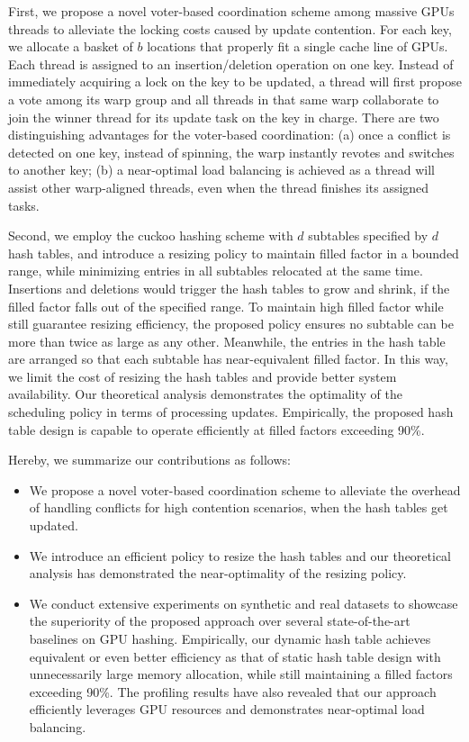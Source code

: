 First, we propose a novel voter-based coordination scheme among massive GPUs threads to alleviate the locking costs caused by update contention. 
For each key, we allocate a basket of $b$ locations that properly fit a single cache line of GPUs. Each thread is assigned to an insertion/deletion operation on one key. Instead of immediately acquiring a lock on the key to be updated, a thread will first propose a vote among its warp group and all threads in that same warp collaborate to join the winner thread for its update task on the key in charge. There are two distinguishing advantages for the voter-based coordination: (a) once a conflict is detected on one key, instead of spinning, the warp instantly revotes and switches to another key; (b) a near-optimal load balancing is achieved as a thread will assist other warp-aligned threads, even when the thread finishes its assigned tasks.

Second, we employ the cuckoo hashing scheme with $d$ subtables specified by $d$ hash tables, and introduce a resizing policy to maintain filled factor in a bounded range, while minimizing entries in all subtables relocated at the same time. Insertions and deletions would trigger the hash tables to grow and shrink, if the filled factor falls out of the specified range. To maintain high filled factor while still guarantee resizing efficiency, the proposed policy ensures no subtable can be more than twice as large as any other. Meanwhile, the entries in the hash table are arranged so that each subtable has near-equivalent filled factor.
 In this way, we limit the cost of resizing the hash tables and provide better system availability.
Our theoretical analysis demonstrates the optimality of the scheduling policy in terms of processing updates. 
Empirically, the proposed hash table design is capable to operate efficiently at filled factors exceeding 90\%.

Hereby, we summarize our contributions as follows:
\begin{itemize}
	\item We propose a novel voter-based coordination scheme to alleviate the overhead of handling conflicts for high contention scenarios, when the hash tables get updated.  
	\item We introduce an efficient policy to resize the hash tables and our theoretical analysis has demonstrated the near-optimality of the resizing policy.
	\item We conduct extensive experiments on synthetic and real datasets to showcase the superiority of the proposed approach over several state-of-the-art baselines on GPU hashing. Empirically, our dynamic hash table achieves equivalent or even better efficiency as that of static hash table design with unnecessarily large memory allocation, while still maintaining a filled factors exceeding 90\%. The profiling results have also revealed that our approach efficiently leverages GPU resources and demonstrates near-optimal load balancing. 
\end{itemize}

